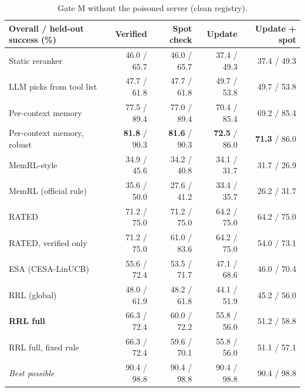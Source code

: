 \begin{table}[t]
\centering
\small
\begin{tabular}{lrrrr}
\toprule
Overall / held-out success (\%) & Verified & Spot check & Update & Update + spot \\
\midrule
Static reranker & 46.0 / 65.7 & 46.0 / 65.7 & 37.4 / 49.3 & 37.4 / 49.3 \\
LLM picks from tool list & 47.7 / 61.8 & 47.7 / 61.8 & 49.7 / 53.8 & 49.7 / 53.8 \\
Per-context memory & 77.5 / 89.4 & 77.0 / 89.4 & 70.4 / 85.4 & 69.2 / 85.4 \\
Per-context memory, robust & \textbf{81.8} / 90.3 & \textbf{81.6} / 90.3 & \textbf{72.5} / 86.0 & \textbf{71.3} / 86.0 \\
MemRL-style & 34.9 / 45.6 & 34.2 / 40.8 & 34.1 / 31.7 & 31.7 / 26.9 \\
MemRL (official rule) & 35.6 / 50.0 & 27.6 / 41.2 & 33.4 / 35.7 & 26.2 / 31.7 \\
RATED & 71.2 / 75.0 & 71.2 / 75.0 & 64.2 / 75.0 & 64.2 / 75.0 \\
RATED, verified only & 71.2 / 75.0 & 61.0 / 83.6 & 64.2 / 75.0 & 54.0 / 73.1 \\
ESA (CESA-LinUCB) & 55.6 / 72.4 & 53.5 / 71.7 & 47.1 / 68.6 & 46.0 / 70.4 \\
\midrule
RRL (global) & 48.0 / 61.9 & 48.2 / 61.8 & 44.1 / 51.9 & 45.2 / 56.0 \\
\textbf{RRL full} & 66.3 / 72.4 & 60.0 / 72.2 & 55.8 / 56.0 & 51.2 / 58.8 \\
RRL full, fixed rule & 66.3 / 72.4 & 59.6 / 70.1 & 55.8 / 56.0 & 51.1 / 57.1 \\
\textit{Best possible} & 90.4 / 98.8 & 90.4 / 98.8 & 90.4 / 98.8 & 90.4 / 98.8 \\
\bottomrule
\end{tabular}
\caption{Gate M without the poisoned server (clean registry).}
\label{tab:gatemclean}
\end{table}
